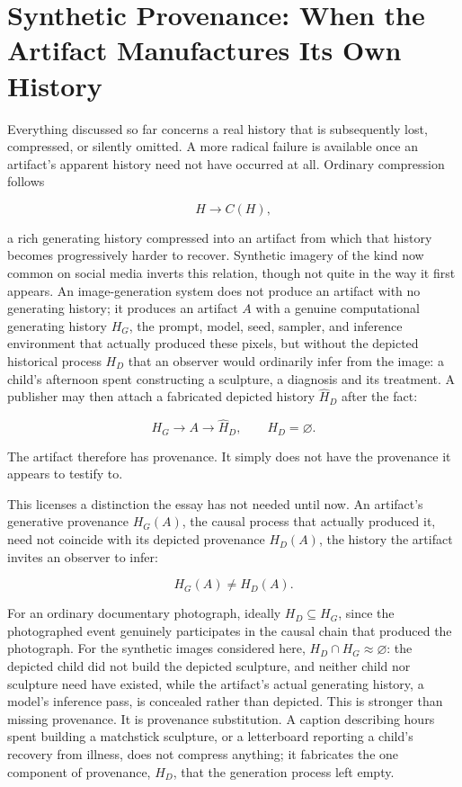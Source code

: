 \documentclass[11pt]{article}
\begin{document}
\section{Synthetic Provenance: When the Artifact Manufactures Its Own History}
\label{sec:synthetic}

Everything discussed so far concerns a real history that is subsequently lost, compressed, or silently omitted. A more radical failure is available once an artifact's apparent history need not have occurred at all. Ordinary compression follows

\[
H \longrightarrow C(H),
\]

a rich generating history compressed into an artifact from which that history becomes progressively harder to recover. Synthetic imagery of the kind now common on social media inverts this relation, though not quite in the way it first appears. An image-generation system does not produce an artifact with no generating history; it produces an artifact $A$ with a genuine computational generating history $H_G$, the prompt, model, seed, sampler, and inference environment that actually produced these pixels, but without the depicted historical process $H_D$ that an observer would ordinarily infer from the image: a child's afternoon spent constructing a sculpture, a diagnosis and its treatment. A publisher may then attach a fabricated depicted history $\widehat H_D$ after the fact:

\[
H_G \longrightarrow A \longrightarrow \widehat H_D, \qquad H_D = \varnothing.
\]

The artifact therefore has provenance. It simply does not have the provenance it appears to testify to.

This licenses a distinction the essay has not needed until now. An artifact's generative provenance $H_G(A)$, the causal process that actually produced it, need not coincide with its depicted provenance $H_D(A)$, the history the artifact invites an observer to infer:

\[
H_G(A) \neq H_D(A).
\]

For an ordinary documentary photograph, ideally $H_D \subseteq H_G$, since the photographed event genuinely participates in the causal chain that produced the photograph. For the synthetic images considered here, $H_D \cap H_G \approx \varnothing$: the depicted child did not build the depicted sculpture, and neither child nor sculpture need have existed, while the artifact's actual generating history, a model's inference pass, is concealed rather than depicted. This is stronger than missing provenance. It is provenance substitution. A caption describing hours spent building a matchstick sculpture, or a letterboard reporting a child's recovery from illness, does not compress anything; it fabricates the one component of provenance, $H_D$, that the generation process left empty.
\end{document}
